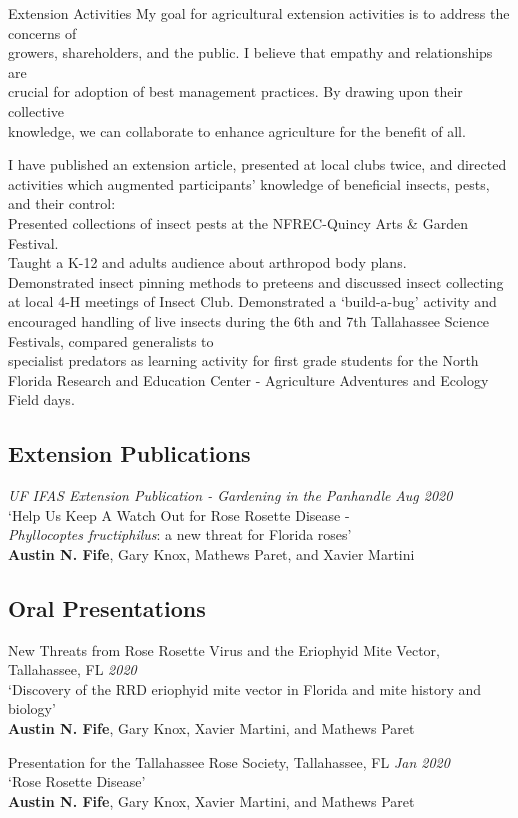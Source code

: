 \documentclass{resume} %
\begin{document}
\begin{rSection}{Extension Activities}
	My goal for agricultural extension activities is to address the concerns of\\
	growers, shareholders, and the public. I believe that empathy and relationships are\\
	crucial	for adoption of best management practices. By drawing upon their collective\\
	knowledge, we can collaborate to enhance agriculture for the benefit of all. 
	
	I have published an extension article, presented at local clubs twice, and directed	activities which augmented participants' knowledge of beneficial insects, pests, and their control:\\
	Presented collections of insect pests at the NFREC-Quincy Arts \& Garden Festival.\\
	Taught a K-12 and adults audience about arthropod body plans.\\
	Demonstrated insect pinning methods	to preteens and discussed insect collecting at local 4-H meetings of Insect Club. Demonstrated a `build-a-bug' activity and encouraged handling of live insects during the 6th and 7th Tallahassee Science Festivals, compared generalists	to\\
	specialist predators as learning activity for first grade students for the North Florida Research and Education Center - Agriculture Adventures and Ecology Field days.
	
	\subsection*{Extension Publications}
	\textit{UF IFAS Extension Publication - Gardening in the Panhandle} \hfill {\em \textit{Aug 2020}}\\
	`Help Us Keep A Watch Out for Rose Rosette Disease -\\ 
	\textit{Phyllocoptes fructiphilus}: a new threat for Florida roses'\\
	\textbf{Austin N. Fife}, Gary Knox, Mathews Paret, and Xavier Martini\\ \hfill

	\subsection*{Oral Presentations}
	New Threats from Rose Rosette Virus and the Eriophyid Mite Vector, Tallahassee, FL \hfill {\em \textit{2020}}\\
	`Discovery of the RRD eriophyid mite vector in Florida and mite history and biology'\\
	\textbf{Austin N. Fife}, Gary Knox, Xavier Martini, and Mathews Paret\\ \hfill
	
	Presentation for the Tallahassee Rose Society, Tallahassee, FL \hfill {\em \textit{Jan 2020}}\\
	`Rose Rosette Disease'\\
	\textbf{Austin N. Fife}, Gary Knox, Xavier Martini, and Mathews Paret\\ \hfill
	
\end{rSection}
\end{document}
